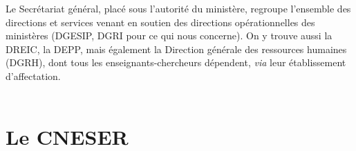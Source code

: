 Le Secr\'etariat g\'en\'eral, plac\'e sous l'autorit\'e du minist\`ere, regroupe l'ensemble des directions et services venant en soutien des directions op\'erationnelles des minist\`eres (DGESIP, DGRI pour ce qui nous concerne). On y trouve aussi la DREIC, la DEPP, mais \'egalement la Direction g\'en\'erale des ressources humaines (DGRH), dont tous les enseignants-chercheurs d\'ependent, {\it via} leur \'etablissement d'affectation. \\
{\small {}} \\
{\small {}}

\section{Le CNESER}\label{CNESER}


